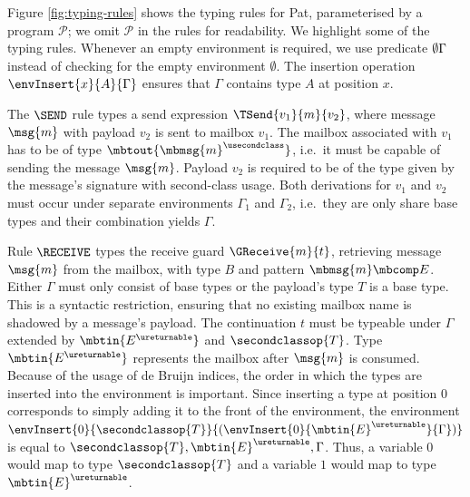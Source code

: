 Figure \ref{fig:typing-rules} shows the typing rules for Pat, parameterised by a
program $\mathcal{P}$; we omit $\mathcal{P}$ in the rules for readability.
We highlight some of the typing rules.
Whenever an empty environment is required, we use predicate $\emptyset{\Gamma}$ instead of checking for the empty environment $\emptyset$.
The insertion operation $\envInsert{x}{A}{\Gamma}$ ensures that $\Gamma$ contains type $A$ at position $x$.

The $\SEND$ rule types a send expression $\TSend{v_1}{m}{v_2}$, where message $\msg{m}$ with payload $v_2$ is sent to mailbox $v_1$.
The mailbox associated with $v_1$ has to be of type $\mbtout{\mbmsg{m}^\usecondclass}$, i.e.\ it must be capable of sending the message $\msg{m}$.
Payload $v_2$ is required to be of the type given by the message's signature with second-class usage.
Both derivations for $v_1$ and $v_2$ must occur under separate environments $\Gamma_1$ and $\Gamma_2$, i.e.\ they are only share base types and their combination yields $\Gamma$.


Rule $\RECEIVE$ types the receive guard $\GReceive{m}{t}$, retrieving message $\msg{m}$ from the mailbox, with type $B$ and pattern $\mbmsg{m} \mbcomp E$.
Either $\Gamma$ must only consist of base types or the payload's type $T$ is a base type.
This is a syntactic restriction, ensuring that no existing mailbox name is shadowed by a message's payload.
The continuation $t$ must be typeable under $\Gamma$ extended by $\mbtin{E^\ureturnable}$ and $\secondclassop{T}$.
Type $\mbtin{E^\ureturnable}$ represents the mailbox after $\msg{m}$ is consumed.
Because of the usage of de Bruijn indices, the order in which the types are inserted into the environment is important.
Since inserting a type at position $0$ corresponds to simply adding it to the front of the environment,
the environment $\envInsert{0}{\secondclassop{T}}{(\envInsert{0}{\mbtin{E}^\ureturnable}{\Gamma})}$ is equal to $\secondclassop{T}, \mbtin{E}^\ureturnable, \Gamma$.
Thus, a variable $0$ would map to type $\secondclassop{T}$ and a variable $1$ would map to type $\mbtin{E}^\ureturnable$.

